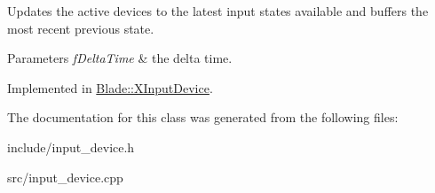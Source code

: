 Updates the active devices to the latest input states available and buffers the most recent previous state. 


\begin{DoxyParams}{Parameters}
{\em f\+Delta\+Time} & the delta time. \\
\hline
\end{DoxyParams}


Implemented in \hyperlink{class_blade_1_1_x_input_device_a32a94ba12dd032a93a56b766073c7159}{Blade\+::\+X\+Input\+Device}.



The documentation for this class was generated from the following files\+:\begin{DoxyCompactItemize}
\item 
include/input\+\_\+device.\+h\item 
src/input\+\_\+device.\+cpp\end{DoxyCompactItemize}
